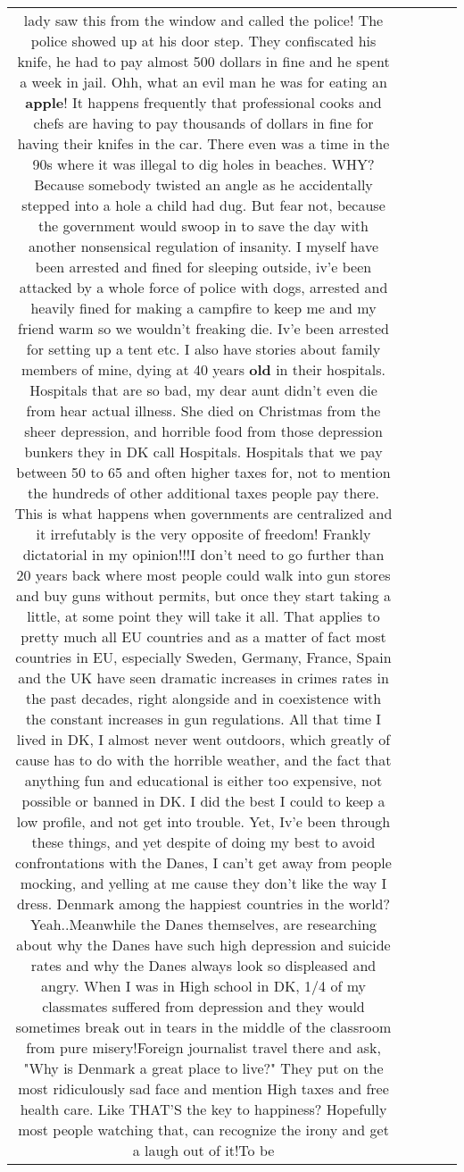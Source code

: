 \documentclass[11pt]{article}
\newlength\mylength
\begin{document}
\begin{center}
\begin{longtable}{|C{.65\mylength}|C{.30\mylength}|C{.12\mylength}|C{.12\mylength}|C{.12\mylength}|}
lady saw this from the window and called the police! The police showed up at his door step. They confiscated his knife, he had to pay almost 500 dollars in fine and he spent a week in jail. Ohh, what an evil man he was for eating an \textbf{apple}! It happens frequently that professional cooks and chefs are having to pay thousands of dollars in fine for having their knifes in the car. There even was a time in the 90s where it was illegal to dig holes in beaches. WHY? Because somebody twisted an angle as he accidentally stepped into a hole a child had dug. But fear not, because the government would swoop in to save the day with another nonsensical regulation of insanity. I myself have been arrested and fined for sleeping outside, iv'e been attacked by a whole force of police with dogs, arrested and heavily fined for making a campfire to keep me and my friend warm so we wouldn't freaking die. Iv'e been arrested for setting up a tent etc. I also have stories about family members of mine, dying at 40 years \textbf{old} in their hospitals. Hospitals that are so bad, my dear aunt didn't even die from hear actual illness. She died on Christmas from the sheer depression, and horrible food from those depression bunkers they in DK call Hospitals. Hospitals that we pay between 50 to 65 and often higher taxes for, not to mention the hundreds of other additional taxes people pay there. This is what happens when governments are centralized and it irrefutably is the very opposite of freedom! Frankly dictatorial in my opinion!!!I don't need to go further than 20 years back where most people could walk into gun stores and buy guns without permits, but once they start taking a little, at some point they will take it all. That applies to pretty much all EU countries and as a matter of fact most countries in EU, especially Sweden, Germany, France, Spain and the UK have seen dramatic increases in crimes rates in the past decades, right alongside and in coexistence with the constant increases in gun regulations. All that time I lived in DK, I almost never went outdoors, which greatly of cause has to do with the horrible weather, and the fact that anything fun and educational is either too expensive, not possible or banned in DK. I did the best I could to keep a low profile, and not get into trouble. Yet, Iv'e been through these things, and yet despite of doing my best to avoid confrontations with the Danes, I can't get away from people mocking, and yelling at me cause they don't like the way I dress. Denmark among the happiest countries in the world? Yeah..Meanwhile the Danes themselves, are researching about why the Danes have such high depression and suicide rates and why the Danes always look so displeased and angry. When I was in High school in DK, 1/4 of my classmates suffered from depression and they would sometimes break out in tears in the middle of the classroom from pure misery!Foreign journalist travel there and ask, "Why is Denmark a great place to live?" They put on the most ridiculously sad face and mention High taxes and free health care. Like THAT'S the key to happiness? Hopefully most people watching that, can recognize the irony and get a laugh out of it!To be 
\end{longtable}
\end{center}
\end{document}
